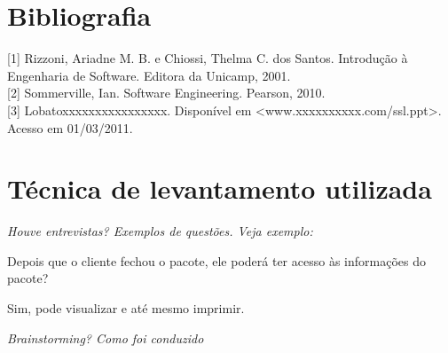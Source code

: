 \documentclass[12pt,twoside,a4paper]{article}
\begin{document}
\section{Bibliografia}

[1]  Rizzoni, Ariadne M. B. e Chiossi, Thelma C. dos Santos. Introdução à Engenharia de Software. Editora da Unicamp, 2001.\\

[2]  Sommerville, Ian. Software Engineering. Pearson, 2010.\\

[3]  Lobatoxxxxxxxxxxxxxxxx. Disponível em <www.xxxxxxxxxx.com/ssl.ppt>. Acesso em 01/03/2011.

\newpage
\section{Técnica de levantamento utilizada}

\textit{Houve entrevistas? Exemplos de questões. Veja exemplo:}

Depois que o cliente fechou o pacote, ele poderá ter acesso às informações do pacote?

Sim, pode visualizar e até mesmo imprimir.


\textit{Brainstorming? Como foi conduzido}
\end{document}
